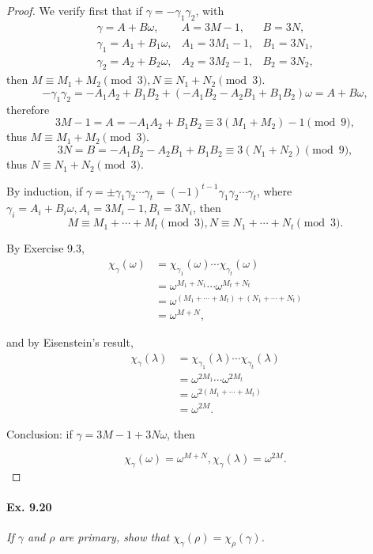 \documentclass[11pt,a4paper]{article}
\begin{document}
\begin{proof}
We verify first that if $\gamma = -\gamma_1 \gamma_2$, with
$$
\begin{array}{lll}
  \gamma = A+B\omega, & A=3M-1,  & B=3N,  \\
   \gamma_1 = A_1+B_1\omega,& A_1= 3M_1-1,  &  B_1=3N_1, \\
  \gamma_2 = A_2+B_2\omega,&  A_2= 3M_2-1, &  B_2=3N_2, 
\end{array}
$$
then $M \equiv M_1+M_2\pmod 3,N \equiv N_1+N_2 \pmod 3$.
$$-\gamma_1 \gamma_2 = -A_1A_2 + B_1 B_2  + (- A_1B_2-A_2B_1+B_1B_2) \omega=A+B\omega,$$
therefore
$$3M-1 = A =-A_1A_2 + B_1 B_2 \equiv 3(M_1+M_2) - 1\pmod 9,$$
thus $M\equiv M_1+M_2\pmod 3.$
$$3N = B = -A_1B_2-A_2B_1+B_1B_2 \equiv 3 (N_1+N_2)\pmod 9,$$ 
thus $N \equiv N_1+N_2 \pmod 3.$

By induction, if $\gamma = \pm \gamma_1 \gamma_2\cdots \gamma_t = (-1)^{t-1} \gamma_1 \gamma_2\cdots \gamma_t$, where $\gamma_i = A_i+B_i\omega,A_i= 3M_i-1,B_i=3N_i$, then
$$M \equiv M_1+\cdots+M_t\pmod 3, N \equiv N_1+\cdots + N_t \pmod 3.$$

By Exercise 9.3,
\begin{align*}
\chi_\gamma(\omega) &= \chi_{\gamma_1}(\omega)\cdots\chi_{\gamma_t}(\omega)\\
&=\omega^{M_1+N_1}\cdots \omega^{M_t+N_t}\\
&=\omega^{(M_1+\cdots+M_t)+(N_1+\cdots+N_t)}\\
&=\omega^{M+N},
\end{align*}

and by Eisenstein's result,
\begin{align*}
\chi_\gamma(\lambda) &= \chi_{\gamma_1}(\lambda)\cdots\chi_{\gamma_t}(\lambda)\\
&=\omega^{2M_1}\cdots \omega^{2M_t}\\
&=\omega^{2(M_1+\cdots+M_t)}\\
&=\omega^{2M}.
\end{align*}

Conclusion: if $\gamma = 3M-1+3N\omega$, then

$$\chi_\gamma(\omega) = \omega^{M+N}, \chi_\gamma(\lambda)=\omega^{2M}.$$
\end{proof}

\paragraph{Ex. 9.20}

{\it If $\gamma$ and $\rho$ are primary, show that $\chi_\gamma(\rho) = \chi_\rho(\gamma)$.
}
\end{document}
